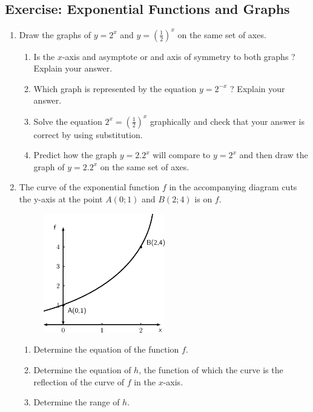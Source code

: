 \subsection*{ Exercise: Exponential Functions and Graphs }
\nopagebreak
\begin{enumerate}[noitemsep, label=\textbf{\arabic*}. ] 
\item Draw the graphs of $y={2}^{x}$ and $y={(\frac{1}{2})}^{x}$ on the same set of axes.
\begin{enumerate}[noitemsep, label=\textbf{\alph*}. ] 
\item Is the $x$-axis and asymptote or and axis of symmetry to both graphs ? Explain your answer.
\item Which graph is represented by the equation $y={2}^{-x}$ ? Explain your answer.
\item Solve the equation ${2}^{x}={(\frac{1}{2})}^{x}$ graphically and check that your answer is correct by using substitution.
\item Predict how the graph $y=2.{2}^{x}$ will compare to $y={2}^{x}$ and then draw the graph of $y=2.{2}^{x}$ on the same set of axes.
\end{enumerate}
  \item The curve of the exponential function $f$ in the accompanying diagram cuts the y-axis at the point $A(0; 1)$ and $B(2; 4)$ is on $f$.
\setcounter{subfigure}{0}
\begin{figure}[H] %
\begin{center}
\label{m39348*id253318!!!underscore!!!media}\label{m39348*id253318!!!underscore!!!printimage}\includegraphics[width=200px]{col11306.imgs/m39348_MG10C11_033.png} %
\vspace{2pt}
\vspace{.1in}
\end{center}
\end{figure}       

\begin{enumerate}[noitemsep, label=\textbf{\alph*}. ] 
\item Determine the equation of the function $f$.
\item Determine the equation of $h$, the function of which the curve is the reflection of the curve of $f$ in the $x$-axis.
\item Determine the range of $h$.
\end{enumerate}
  \end{enumerate}

